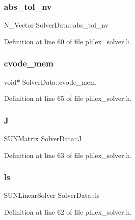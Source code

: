 \subsubsection{\texorpdfstring{abs\+\_\+tol\+\_\+nv}{abs\_tol\_nv}}
{\footnotesize\ttfamily N\+\_\+\+Vector Solver\+Data\+::abs\+\_\+tol\+\_\+nv}



Definition at line 60 of file phlex\+\_\+solver.\+h.

\mbox{\label{struct_solver_data_af214123f600541c13da1881003c9f20b}} 
\subsubsection{\texorpdfstring{cvode\+\_\+mem}{cvode\_mem}}
{\footnotesize\ttfamily void$\ast$ Solver\+Data\+::cvode\+\_\+mem}



Definition at line 65 of file phlex\+\_\+solver.\+h.

\mbox{\label{struct_solver_data_a0c76c01fb6686764f834ba6c7d67f2a0}} 
\subsubsection{\texorpdfstring{J}{J}}
{\footnotesize\ttfamily S\+U\+N\+Matrix Solver\+Data\+::J}



Definition at line 63 of file phlex\+\_\+solver.\+h.

\mbox{\label{struct_solver_data_a02d8b68a97c3bfd56f935c18820bf9c6}} 
\subsubsection{\texorpdfstring{ls}{ls}}
{\footnotesize\ttfamily S\+U\+N\+Linear\+Solver Solver\+Data\+::ls}



Definition at line 62 of file phlex\+\_\+solver.\+h.

\mbox{\label{struct_solver_data_addacaed7357d35a1c6f521a86845121d}} 
